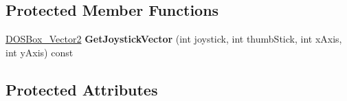 \subsection*{Protected Member Functions}
\begin{DoxyCompactItemize}
\item 
\hypertarget{classCStickBindGroup_a8113fadfd2e268dc5a5e6f9bdf00fb8e}{\hyperlink{structDOSBox__Vector2}{D\-O\-S\-Box\-\_\-\-Vector2} {\bfseries Get\-Joystick\-Vector} (int joystick, int thumb\-Stick, int x\-Axis, int y\-Axis) const }\label{classCStickBindGroup_a8113fadfd2e268dc5a5e6f9bdf00fb8e}

\end{DoxyCompactItemize}
\subsection*{Protected Attributes}
